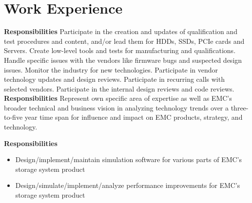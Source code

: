 \section{Work Experience}

{
{\bfseries Responsibilities} Participate in the creation and updates of qualification and test procedures and content,
and/or lead them
for HDDs, SSDs, PCIe cards and Servers. Create low-level tools and tests for manufacturing and qualifications.
Handle specific issues with the vendors like firmware bugs and suspected design issues.
Monitor the industry for new technologies. Participate in vendor technology updates and design reviews.
Participate in recurring calls with selected vendors.
Participate in the internal design reviews and code reviews.}
{
}
{
}
{{\bfseries Responsibilities}
Represent own specific area of expertise as well as EMC's broader technical and business vision in analyzing technology
trends over a three-to-five year time span for influence and impact on EMC products, strategy, and technology.
}
{
}
{
}
{
}
{{\bfseries Responsibilities}
\begin{itemize}
\item  Design/implement/maintain simulation software for various parts of EMC's storage system product
\item  Design/simulate/implement/analyze performance improvements for EMC's storage system product
\end{itemize}
}
